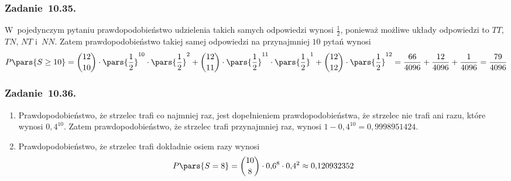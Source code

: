 \subsubsection*{Zadanie~10.35.}
W~pojedynczym pytaniu prawdopodobieństwo udzielenia takich samych odpowiedzi wynosi \(\frac{1}{2}\), ponieważ możliwe układy odpowiedzi to \(TT\), \(TN\), \(NT\) i~\(NN\). Zatem prawdopodobieństwo takiej samej odpowiedzi na przynajmniej \(10\) pytań wynosi
\begin{equation*}
    P\pars{S \geq 10}
        = \binom{12}{10} \cdot \pars{\frac{1}{2}}^{10} \cdot \pars{\frac{1}{2}}^2 + \binom{12}{11} \cdot \pars{\frac{1}{2}}^{11} \cdot \pars{\frac{1}{2}}^1 + \binom{12}{12} \cdot \pars{\frac{1}{2}}^{12}
        = \frac{66}{4096} + \frac{12}{4096} + \frac{1}{4096}
        = \frac{79}{4096}
\end{equation*}
\subsubsection*{Zadanie~10.36.}
\begin{enumerate}[label={\alph*)}]
    \item Prawdopodobieństwo, że strzelec trafi co najmniej raz, jest dopełnieniem prawdopodobieństwa, że strzelec nie trafi ani razu, które wynosi \(0{,}4^{10}\). Zatem prawdopodobieństwo, że strzelec trafi przynajmniej raz, wynosi \(1 - 0{,}4^{10} = 0{,}9998951424\).
    \item Prawdopodobieństwo, że strzelec trafi dokładnie osiem razy wynosi
        \begin{equation*}
            P\pars{S = 8}
                = \binom{10}{8} \cdot 0{,}6^8 \cdot 0{,}4^2
                \approx 0{,}120932352
        \end{equation*}
\end{enumerate}
